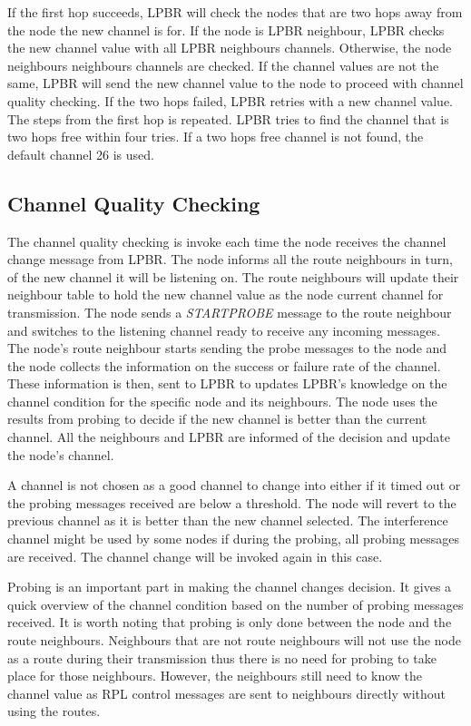 If the first hop succeeds, LPBR will check the nodes that are two hops away from the node the new channel is for. If the node is LPBR neighbour, LPBR checks the new channel value with all LPBR neighbours channels. Otherwise, the node neighbours neighbours channels are checked. If the channel values are not the same, LPBR will send the new channel value to the node to proceed with channel quality checking. If the two hops failed, LPBR retries with a new channel value. The steps from the first hop is repeated. LPBR tries to find the channel that is two hops free within four tries. If a two hops free channel is not found, the default channel 26 is used.

\subsection{Channel Quality Checking}

The channel quality checking is invoke each time the node receives the channel change message from LPBR. The node informs all the route neighbours in turn, of the new channel it will be listening on. The route neighbours will update their neighbour table to hold the new channel value as the node current channel for transmission. The node sends a \emph{STARTPROBE} message to the route neighbour and switches to the listening channel ready to receive any incoming messages. The node's route neighbour starts sending the probe messages to the node and the node collects the information on the success or failure rate of the channel. These information is then, sent to LPBR to updates LPBR's knowledge on the channel condition for the specific node and its neighbours. The node uses the results from probing to decide if the new channel is better than the current channel. All the neighbours and LPBR are informed of the decision and update the node's channel.

A channel is not chosen as a good channel to change into either if it timed out or the probing messages received are below a threshold. The node will revert to the previous channel as it is better than the new channel selected. The interference channel might be used by some nodes if during the probing, all probing messages are received. The channel change will be invoked again in this case.

Probing is an important part in making the channel changes decision. It gives a quick overview of the channel condition based on the number of probing messages received. It is worth noting that probing is only done between the node and the route neighbours. Neighbours that are not route neighbours will not use the node as a route during their transmission thus there is no need for probing to take place for those neighbours. However, the neighbours still need to know the channel value as RPL control messages are sent to neighbours directly without using the routes.


